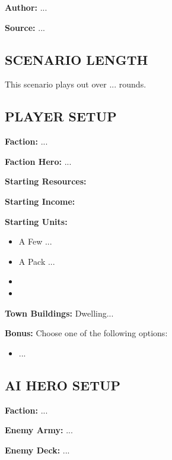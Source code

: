 
\begin{multicols*}{2}

\textbf{Author:} ...

\textbf{Source:} ...

\subsection*{\MakeUppercase{Scenario length}}

This scenario plays out over ... rounds.

\subsection*{\MakeUppercase{Player setup}}

\textbf{Faction:} ...

\textbf{Faction Hero:} ...

\textbf{Starting Resources:}\par
{}

\textbf{Starting Income:}\par
{}

\textbf{Starting Units:}
\begin{itemize}
  \item A Few ...
  \item A Pack ...
  \item {}
  \item {}
\end{itemize}

\textbf{Town Buildings:}  Dwelling...

\textbf{Bonus:} Choose one of the following options: 
\begin{itemize}
    \item ...
\end{itemize}

\subsection*{\MakeUppercase{AI hero setup}}

\textbf{Faction:} ...

\textbf{Enemy Army:} ...

\textbf{Enemy Deck:} ...


\end{multicols*}
